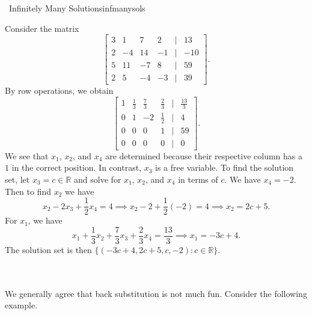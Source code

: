         \begin{example}{\Difficulty\,\Difficulty\,\,Infinitely Many Solutions}{infmanysols}
            
            Consider the matrix
            \begin{equation*}
                \begin{bmatrix} 
                3 & 1 & 7 & 2 & | & 13 \\
                2 & -4 & 14 & -1 & | & -10 \\
                5 & 11 & -7 & 8 & | & 59 \\
                2 & 5 & -4 & -3 & | & 39
                \end{bmatrix}.
            \end{equation*}
            By row operations, we obtain
            \begin{equation*}
                \begin{bmatrix} 
                1 & \frac{1}{3} & \frac{7}{3} & \frac{2}{3} & | & \frac{13}{3} \\
                0 & 1 & -2 & \frac{1}{2} & | & 4 \\
                0 & 0 & 0 & 1 & | & 59 \\
                0 & 0 & 0 & 0 & | & 0
                \end{bmatrix}.
            \end{equation*}
            We see that \(x_1\), \(x_2\), and \(x_4\) are determined because their respective column has a \(1\) in the correct position. In contrast, \(x_3\) is a free variable. To find the solution set, let \(x_3=c\in\mathbb{R}\) and solve for \(x_1\), \(x_2\), and \(x_4\) in terms of \(c\). We have \(x_4=-2\). Then to find \(x_2\) we have
            \begin{equation*}
                x_2-2x_3+\frac{1}{2}x_4=4\implies x_2-2+\frac{1}{2}(-2)=4\implies x_2=2c+5.
            \end{equation*}
            For \(x_1\), we have
            \begin{equation*}
                x_1+\frac{1}{3}x_2+\frac{7}{3}x_3+\frac{2}{3}x_4=\frac{13}{3}\implies x_1=-3c+4.
            \end{equation*}
            The solution set is then \(\{(-3c+4,2c+5,c,-2):c\in\mathbb{R}\}\).
        \end{example}
        \vphantom
        \\
        \\
        We generally agree that back substitution is not much fun. Consider the following example.

